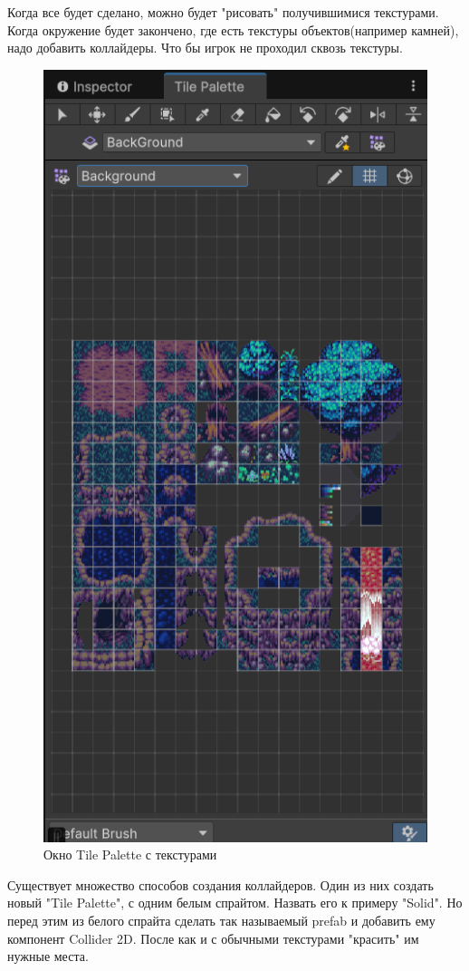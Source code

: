 \documentclass[bachelor, och, coursework, times]{SCWorks}
\begin{document}
    Когда все будет сделано, можно будет "рисовать" получившимися текстурами. Когда окружение будет 
    закончено, где есть текстуры объектов(например камней), надо добавить коллайдеры.
    Что бы игрок не проходил сквозь текстуры. 

    \begin{figure} [H]
        \centering
    \includegraphics[width=0.50\linewidth]{Pictures/Снимок экрана 2025-06-25 203428.png}
    \caption{Окно Tile Palette с текстурами}
    \label{fig:Textures}
    \end{figure}

    Существует множество способов создания коллайдеров. Один из них создать новый "Tile Palette",
    с одним белым спрайтом. Назвать его к примеру "Solid". Но перед этим из белого спрайта сделать 
    так называемый prefab и добавить ему компонент Collider 2D. 
    После как и с обычными текстурами "красить" им нужные места.
\end{document}
